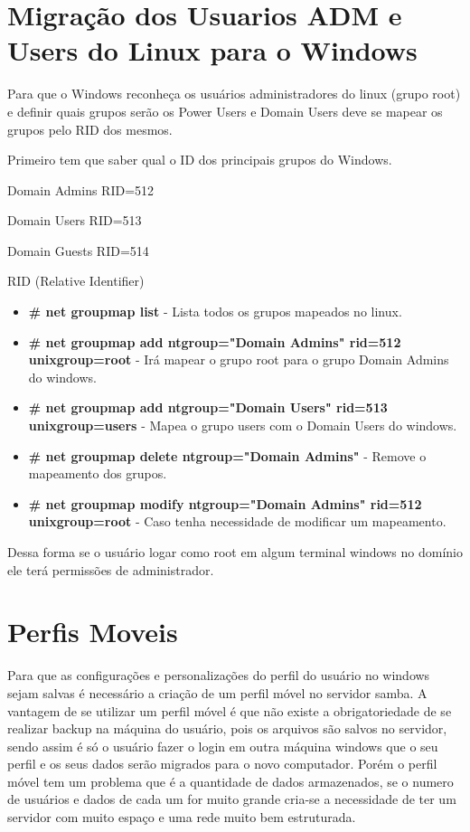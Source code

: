 \section{Migração dos Usuarios ADM e Users do Linux para o Windows}

Para que o Windows reconheça os usuários administradores do linux (grupo root) e definir quais grupos serão os Power Users e Domain Users deve se mapear os grupos pelo RID dos mesmos.

Primeiro tem que saber qual o ID dos principais grupos do Windows.

Domain Admins RID=512 

Domain Users RID=513 

Domain Guests RID=514

RID (Relative Identifier) 

\begin{itemize}
	\item \textbf{\# net groupmap list} - Lista todos os grupos mapeados no linux.
	\item \textbf{\# net groupmap add ntgroup="Domain Admins" rid=512 unixgroup=root} - Irá mapear o grupo root para o grupo Domain Admins do windows.
	\item \textbf{\# net groupmap add ntgroup="Domain Users" rid=513 unixgroup=users} - Mapea o grupo users com o Domain Users do windows.
	\item \textbf{\# net groupmap delete ntgroup="Domain Admins"} - Remove o mapeamento dos grupos.
	\item \textbf{\# net groupmap modify ntgroup="Domain Admins" rid=512 unixgroup=root} - Caso tenha necessidade de modificar um mapeamento.
\end{itemize}

Dessa forma se o usuário logar como root em algum terminal windows no domínio ele terá permissões de administrador.

\section{Perfis Moveis}

Para que as configurações e personalizações do perfil do usuário no windows sejam salvas é necessário a criação de um perfil móvel no servidor samba. 
A vantagem de se utilizar um perfil móvel é que não existe a obrigatoriedade de se realizar backup na máquina do usuário, pois os arquivos são salvos no servidor, sendo assim é só o usuário fazer o login em outra máquina windows que o seu perfil e os seus dados serão migrados para o novo computador. Porém o perfil móvel tem um problema que é a quantidade de dados armazenados, se o numero de usuários e dados de cada um for muito grande cria-se a necessidade de ter um servidor com muito espaço e uma rede muito bem estruturada. 

